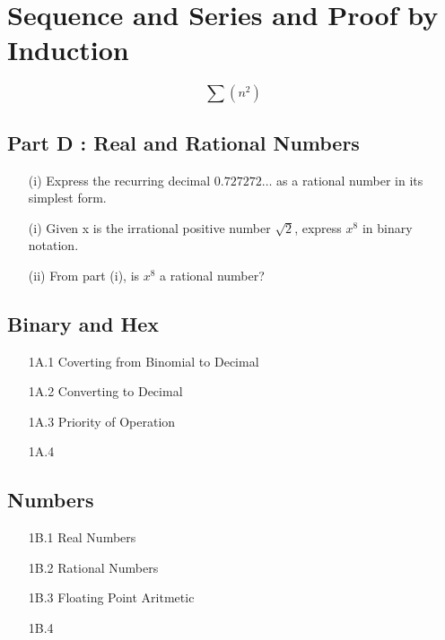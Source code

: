 \documentclass[]{report}
\begin{document}
\section{Sequence and Series and Proof by Induction}


\[\sum (n^2) \]



\subsection*{Part D : Real and Rational Numbers}
\begin{itemize}
\item[(i)] Express the recurring decimal $0.727272\ldots$ as a rational number in its simplest form.
\end{itemize}
\begin{itemize}
\item[(i)] Given x is the irrational positive number $\sqrt{2}$, express $x^8$ in binary notation.
\item[(ii)] From part (i), is $x^8$ a rational number?
\end{itemize}

\subsection*{Binary and Hex}
\begin{itemize}
\item[1A.1] Coverting from Binomial to Decimal
\item[1A.2] Converting to Decimal
\item[1A.3] Priority of Operation
\item[1A.4] 
\end{itemize}

\subsection*{Numbers}
\begin{itemize}
\item[1B.1] Real Numbers
\item[1B.2] Rational Numbers
\item[1B.3] Floating Point Aritmetic
\item[1B.4] 
\end{itemize}
\end{document}
